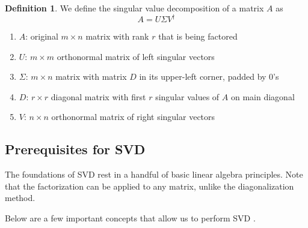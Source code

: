 \documentclass[12pt, reqno]{amsart}
\theoremstyle{definition}
\newtheorem{definition}[theorem]{Definition}
\theoremstyle{remark}
\numberwithin{equation}{section}
\begin{document}
\begin{definition} We define the singular value decomposition of a matrix $A$ as
\begin{equation}\label{1.1}
A = U \Sigma V^\dagger
\end{equation}
\begin{enumerate}
    \item $A$: original $m \times n$ matrix with rank $r$ that is being factored
    \item $U$: $m \times m$ orthonormal matrix of left singular vectors
    \item $\Sigma$: $m \times n$ matrix with matrix $D$ in its upper-left corner, padded by 0's
    \item $D$: $r \times r$ diagonal matrix with first $r$ singular values of $A$ on main diagonal
    \item $V$: $n \times n$ orthonormal matrix of right singular vectors
\end{enumerate}
\end{definition}

\subsection{Prerequisites for SVD}
The foundations of SVD rest in a handful of basic linear algebra principles. Note that the factorization can be applied to any matrix, unlike the diagonalization method.

Below are a few important concepts that allow us to perform SVD \cite{Lay}\cite{Weisstein}.
\end{document}
